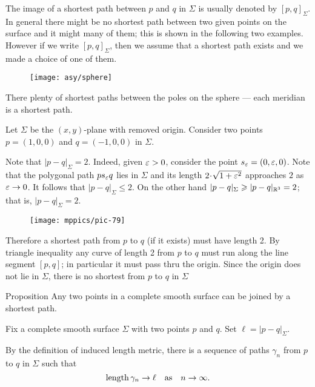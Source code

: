 The image of a shortest path between $p$ and $q$ in $\Sigma$ is usually denoted by $[p,q]_\Sigma$.
In general there might be no shortest path between two given points on the surface
and it might many of them;
this is shown in the following two examples.
However if we write $[p,q]_\Sigma$, then we assume that a shortest path exists and we made a choice of one of them.

\begin{wrapfigure}{r}{28 mm}
\vskip-4mm
\centering
\texttt{[image: asy/sphere]}
\vskip-3mm
\end{wrapfigure}

 There plenty of shortest paths between the poles on the sphere --- each meridian is a shortest path.

 Let $\Sigma$ be the $(x,y)$-plane with removed origin.
Consider two points $p=(1,0,0)$ and $q=(-1,0,0)$ in $\Sigma$.

Note that $|p-q|_\Sigma=2$. 
Indeed, given $\eps\z>0$, consider the point $s_\varepsilon=(0,\varepsilon,0)$.
Note that the polygonal path $ps_\varepsilon q$ lies in $\Sigma$ and its length $2\cdot\sqrt{1+\eps^2}$ approaches $2$ as $\varepsilon\to0$.
It follows that $|p-q|_\Sigma\le 2$.
On the other hand $|p-q|_\Sigma\geqslant |p-q|_{\mathbb{R}^3}=2$; that is, $|p-q|_\Sigma= 2$.

\begin{wrapfigure}{r}{28 mm}
\vskip-0mm
\centering
\texttt{[image: mppics/pic-79]}
\vskip-0mm
\end{wrapfigure}

Therefore a shortest path from $p$ to $q$ (if it exists) must have length 2.
By triangle inequality any curve of length 2 from $p$ to $q$ must run along the line segment $[p,q]$;
in particular it must pass thru the origin.
Since the origin does not lie in $\Sigma$, there is no shortest from $p$ to $q$ in $\Sigma$ 

\begin{thm}{Proposition}
Any two points in a complete smooth surface can be joined by a shortest path. 
\end{thm}

Fix a complete smooth surface $\Sigma$ with two points $p$ and $q$.
Set $\ell=|p-q|_\Sigma$.

By the definition of induced length metric,
there is a sequence of paths $\gamma_n$ from $p$ to $q$ in $\Sigma$ such that
\[\mathop{\rm length}\nolimits\gamma_n\to \ell\quad\text{as}\quad n\to \infty.\]

